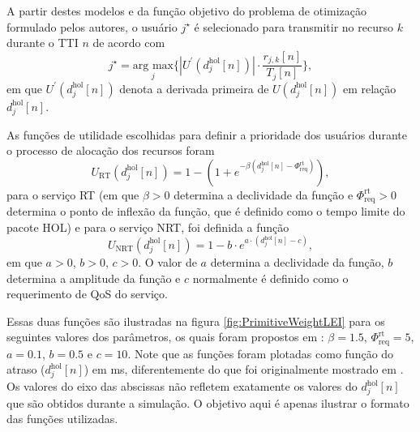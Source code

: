 A partir destes modelos e da função objetivo do problema de otimização formulado pelos autores, o usuário $j^{\star}$ é selecionado para transmitir no recurso $k$ durante o TTI $n$ de acordo com 
%
\begin{equation}
j^{\star} = \underset{j}{\text{arg max}}\Big\{ |U^{'}(d_{j}^{\text{hol}}[n])| \cdot \frac{r_{j, k}[n]}{T_{j}\left[n\right]} \Big \}, 
\end{equation}
%
em que $U^{'}(d_{j}^{\text{hol}}[n])$ denota a derivada primeira de $U(d_{j}^{\text{hol}}[n])$ em relação $d_{j}^{\text{hol}}[n]$.

As funções de utilidade escolhidas para definir a prioridade dos usuários durante o processo de alocação dos recursos foram
%
\begin{equation}
\label{Eq:MDU_RT}
U_{\text{RT}}(d_{j}^{\text{hol}}[n]) = 1 - (1 + e^{-\beta (d_{j}^{\text{hol}}[n] - \Phi_{\text{req}}^{\text{rt}})}),
\end{equation}
%
para o serviço RT (em que $\beta > 0$ determina a declividade da função e $\Phi_{\text{req}}^{\text{rt}} > 0$ determina o ponto de inflexão da função, que é definido como o tempo limite do pacote HOL) e para o serviço NRT, foi definida a função
%
\begin{equation}
U_{\text{NRT}}(d_{j}^{\text{hol}}[n]) = 1 - b \cdot e^{a \cdot  (d_{j}^{\text{hol}}[n] - c)},
\end{equation}
%
em que $a > 0$, $b > 0$, $c>0$. O valor de $a$ determina a declividade da função, $b$ determina a amplitude da função e $c$ normalmente é definido como o requerimento de QoS do serviço.

Essas duas funções são ilustradas na figura \ref{fig:PrimitiveWeightLEI} para os seguintes valores dos parâmetros, os quais foram propostos em : $\beta = 1.5$, $\Phi_{\text{req}}^{\text{rt}} = 5$, $a = 0.1$, $b = 0.5$ e $c = 10$. Note que as funções foram plotadas como função do atraso ($d_{j}^{\text{hol}}[n]$) em ms, diferentemente do que foi originalmente mostrado em . Os valores do eixo das abscissas não refletem exatamente os valores do $d_{j}^{\text{hol}}[n]$ que são obtidos durante a simulação. O objetivo aqui é apenas ilustrar o formato das funções utilizadas. 

